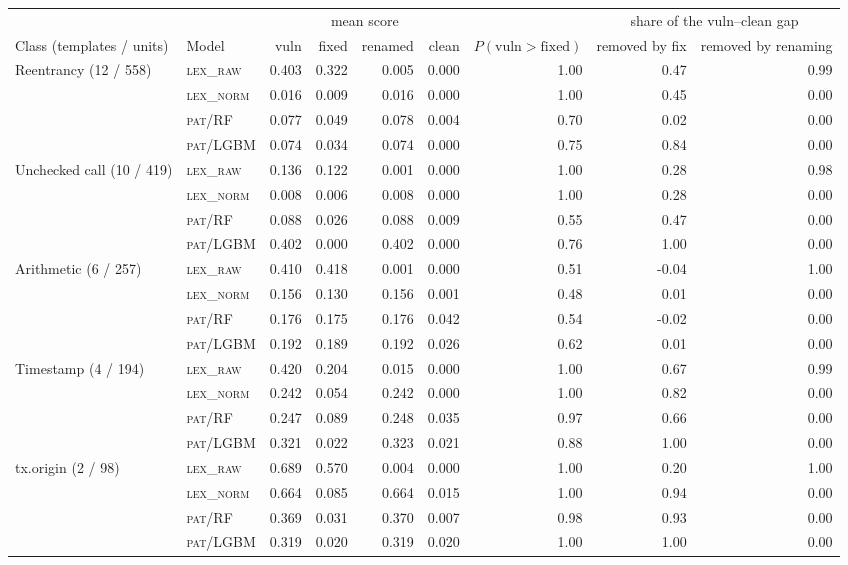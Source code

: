 \begin{tabular}{@{}llrrrrrrr@{}}
\toprule
 & & \multicolumn{4}{c}{mean score} & & \multicolumn{2}{c}{share of the vuln--clean gap}\\
\cmidrule(lr){3-6}\cmidrule(lr){8-9}
Class (templates / units) & Model & vuln & fixed & renamed & clean & $P(\mathrm{vuln}>\mathrm{fixed})$ & removed by fix & removed by renaming\\
\midrule
Reentrancy (12 / 558) & \textsc{lex\_raw} & 0.403 & 0.322 & 0.005 & 0.000 & 1.00 & 0.47 & 0.99\\
 & \textsc{lex\_norm} & 0.016 & 0.009 & 0.016 & 0.000 & 1.00 & 0.45 & 0.00\\
 & \textsc{pat}/RF & 0.077 & 0.049 & 0.078 & 0.004 & 0.70 & 0.02 & 0.00\\
 & \textsc{pat}/LGBM & 0.074 & 0.034 & 0.074 & 0.000 & 0.75 & 0.84 & 0.00\\
\addlinespace[2pt]
Unchecked call (10 / 419) & \textsc{lex\_raw} & 0.136 & 0.122 & 0.001 & 0.000 & 1.00 & 0.28 & 0.98\\
 & \textsc{lex\_norm} & 0.008 & 0.006 & 0.008 & 0.000 & 1.00 & 0.28 & 0.00\\
 & \textsc{pat}/RF & 0.088 & 0.026 & 0.088 & 0.009 & 0.55 & 0.47 & 0.00\\
 & \textsc{pat}/LGBM & 0.402 & 0.000 & 0.402 & 0.000 & 0.76 & 1.00 & 0.00\\
\addlinespace[2pt]
Arithmetic (6 / 257) & \textsc{lex\_raw} & 0.410 & 0.418 & 0.001 & 0.000 & 0.51 & -0.04 & 1.00\\
 & \textsc{lex\_norm} & 0.156 & 0.130 & 0.156 & 0.001 & 0.48 & 0.01 & 0.00\\
 & \textsc{pat}/RF & 0.176 & 0.175 & 0.176 & 0.042 & 0.54 & -0.02 & 0.00\\
 & \textsc{pat}/LGBM & 0.192 & 0.189 & 0.192 & 0.026 & 0.62 & 0.01 & 0.00\\
\addlinespace[2pt]
Timestamp (4 / 194) & \textsc{lex\_raw} & 0.420 & 0.204 & 0.015 & 0.000 & 1.00 & 0.67 & 0.99\\
 & \textsc{lex\_norm} & 0.242 & 0.054 & 0.242 & 0.000 & 1.00 & 0.82 & 0.00\\
 & \textsc{pat}/RF & 0.247 & 0.089 & 0.248 & 0.035 & 0.97 & 0.66 & 0.00\\
 & \textsc{pat}/LGBM & 0.321 & 0.022 & 0.323 & 0.021 & 0.88 & 1.00 & 0.00\\
\addlinespace[2pt]
tx.origin (2 / 98) & \textsc{lex\_raw} & 0.689 & 0.570 & 0.004 & 0.000 & 1.00 & 0.20 & 1.00\\
 & \textsc{lex\_norm} & 0.664 & 0.085 & 0.664 & 0.015 & 1.00 & 0.94 & 0.00\\
 & \textsc{pat}/RF & 0.369 & 0.031 & 0.370 & 0.007 & 0.98 & 0.93 & 0.00\\
 & \textsc{pat}/LGBM & 0.319 & 0.020 & 0.319 & 0.020 & 1.00 & 1.00 & 0.00\\
\bottomrule
\end{tabular}
